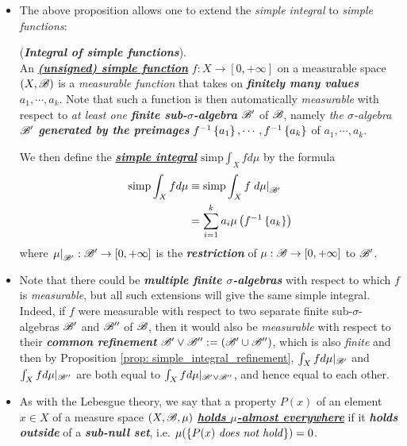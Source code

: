 \documentclass[11pt]{article}
\begin{document}
\begin{itemize}
\item The above proposition allows one to extend the \emph{simple integral} to \emph{simple functions}:
\begin{definition} (\emph{\textbf{Integral of simple functions}}).\\ 
An \underline{\emph{\textbf{(unsigned) simple function}}} $f : X \rightarrow [0,+\infty]$ on a measurable space $(X, {\mathscr B})$ is a \emph{measurable function} that takes on \emph{\textbf{finitely many values}} $a_1, \cdots , a_k$. Note that such a function is then automatically \textit{measurable} with respect to \emph{at least one \textbf{finite sub-$\sigma$-algebra}} ${\mathscr B}'$ of ${\mathscr B}$, namely \emph{the $\sigma$-algebra ${\mathscr B}'$ \textbf{generated by the preimages}} $f^{-1}\left\{a_1\right\}, \cdots,  f^{-1}\left\{a_k\right\}$ of $a_1, \cdots , a_k$.

We then define the \underline{\emph{\textbf{simple integral}}} $\text{simp}\int_{X} f d\mu $ by the formula
\begin{align*}
\text{simp}\int_{X} f d\mu &\equiv \text{simp}\int_{X} f \left.{d\mu}\right\vert_{{\mathscr B}'}\\
&= \sum_{i=1}^{k}a_{i}\mu\left(f^{-1}\left\{a_k\right\}\right)
\end{align*}
where $\left.{\mu}\right\vert_{{\mathscr B}'} : {\mathscr B}' \rightarrow [0,+\infty]$ is the \emph{\textbf{restriction}} of $\mu : {\mathscr B} \rightarrow [0,+\infty]$ to ${\mathscr B}'$.
\end{definition}



\item \begin{remark}
Note that there could be \emph{\textbf{multiple finite $\sigma$-algebras}} with respect to which $f$ is \emph{measurable}, but all such
extensions will give the same simple integral.  Indeed, if $f$ were measurable with respect to two separate finite sub-$\sigma$-algebras ${\mathscr B}'$ and ${\mathscr B}''$ of ${\mathscr B}$, then it would also be \emph{measurable} with respect to their \emph{\textbf{common refinement}} ${\mathscr B}' \lor {\mathscr B}'' := ({\mathscr B}' \cup {\mathscr B}'')$, which is also \emph{finite} and then by Proposition \ref{prop: simple_integral_refinement}, $\int_X f d\mu|_{{\mathscr B}'}$ and $\int_X f d\mu|_{{\mathscr B}''}$ are both equal to $\int_X f d\mu|_{{\mathscr B}' \lor {\mathscr B}''}$, and hence equal to each other.
\end{remark}

\item \begin{remark}
As with the Lebesgue theory, we say that a property $P(x)$ of an element $x \in X$ of a measure space $(X, {\mathscr B}, \mu)$ \underline{\emph{\textbf{holds $\mu$-almost everywhere}}} if it \emph{\textbf{holds}} \emph{\textbf{outside}} of a \emph{\textbf{sub-null set}}, i.e. $\mu(\left\{P(x) \text{ \emph{does not hold}}\right\}) = 0$.
\end{remark}


\end{itemize}
\end{document}
